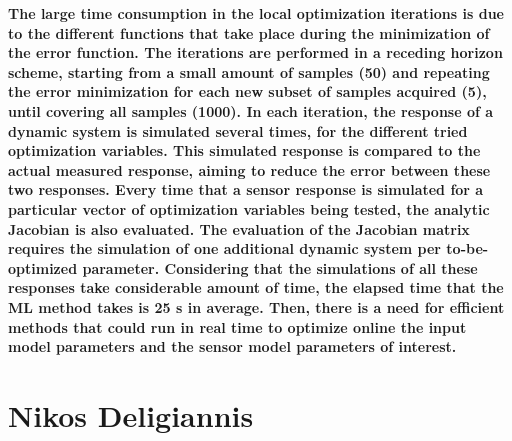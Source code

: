 \documentclass[11pt]{article}
\begin{document}
\begin{itemize}
	{\bfseries The large time consumption in the local optimization iterations is due to the different functions that take place during the minimization of the error function. The iterations are performed in a receding horizon scheme, starting from a small amount of samples (50) and repeating the error minimization for each new subset of samples acquired (5), until covering all samples (1000). In each iteration, the response of a dynamic system is simulated several times, for the different tried optimization variables. This simulated response is compared to the actual measured response, aiming to reduce the error between these two responses. Every time that a sensor response is simulated for a particular vector of optimization variables being tested, the analytic Jacobian is also evaluated. The evaluation of the Jacobian matrix requires the  simulation of one additional dynamic system per to-be-optimized parameter. Considering that the simulations of all these responses take considerable amount of time, the elapsed time that the ML method takes is 25 s in average. Then, there is a need for efficient methods that could run in real time to optimize online the input model parameters and the sensor model parameters of interest. }
	
\end{itemize}


\section*{Nikos Deligiannis}
\end{document}
